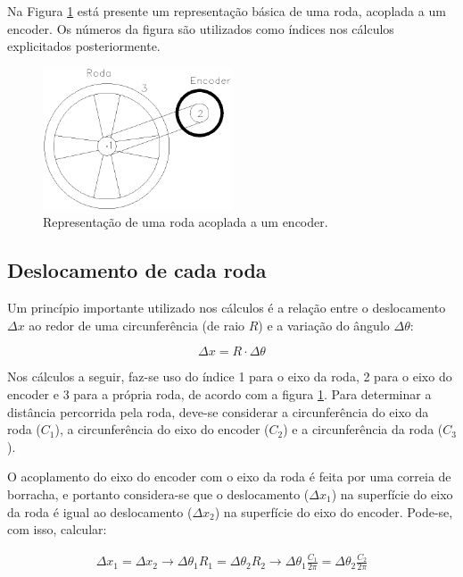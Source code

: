 Na Figura \ref{fig:roda_encoder} está presente um representação básica de uma roda, acoplada a um encoder. Os números da figura são utilizados como índices nos cálculos explicitados posteriormente.

\begin{figure}[H]
  \centering
  \includegraphics[width=0.5\textwidth, keepaspectratio]{./figuras/robo/roda_encoder.png}
  \caption{Representação de uma roda acoplada a um encoder.}
  \label{fig:roda_encoder}
\end{figure}

\subsection{Deslocamento de cada roda}

Um princípio importante utilizado nos cálculos é a relação entre o deslocamento $\Delta x$ ao redor de uma circunferência (de raio $R$) e a variação do ângulo $\Delta \theta$:

\begin{equation}
  \Delta x = R \cdot \Delta \theta
  \label{eq:deslocamento_circunferencia}
\end{equation}

Nos cálculos a seguir, faz-se uso do índice 1 para o eixo da roda, 2 para o eixo do encoder e 3 para a própria roda, de acordo com a figura \ref{fig:roda_encoder}. Para determinar a distância percorrida pela roda, deve-se considerar a circunferência do eixo da roda ($C_1$), a circunferência do eixo do encoder ($C_2$) e a circunferência da roda ($C_3$).

O acoplamento do eixo do encoder com o eixo da roda é feita por uma correia de borracha, e portanto considera-se que o deslocamento ($ \Delta x_1$) na superfície do eixo da roda é igual ao deslocamento ($ \Delta x_2$) na superfície do eixo do encoder. Pode-se, com isso, calcular:

\begin{eqnarray*}
   \Delta x_1 =  \Delta x_2 \rightarrow \Delta \theta_1 R_1 = \Delta \theta_2 R_2 \rightarrow \Delta \theta_1 \frac{C_1}{2 \pi} = \Delta \theta_2 \frac{C_2}{2 \pi} 
\end{eqnarray*}

